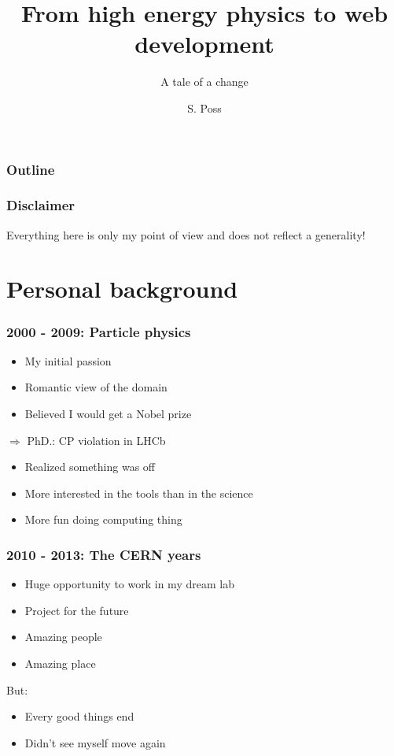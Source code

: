 \documentclass[]{beamer}
\author{S. Poss}
\title{From high energy physics to web development}
\subtitle{A tale of a change}
\begin{document}
\begin{frame}
\titlepage
\end{frame}

\begin{frame}
\frametitle{Outline}
\tableofcontents
\end{frame}

\begin{frame}
\frametitle{Disclaimer}
\centering
Everything here is only my point of view and does not reflect a generality!
\end{frame}

\section{Personal background}
\begin{frame}
\frametitle{2000 - 2009: Particle physics}
\begin{itemize}
\item My initial passion
\item Romantic view of the domain
\item Believed I would get a Nobel prize
\end{itemize}
$\Rightarrow$ PhD.: CP violation in LHCb
\pause
\begin{itemize}
\item Realized something was off
\item More interested in the tools than in the science
\item More fun doing computing thing
\end{itemize}
\end{frame}

\begin{frame}
\frametitle{2010 - 2013: The CERN years}
\begin{itemize}
\item Huge opportunity to work in my dream lab
\item Project for the future
\item Amazing people
\item Amazing place
\end{itemize}
\pause
But:
\begin{itemize}
\item Every good things end
\item Didn't see myself move again
\end{itemize}
\end{frame}
\end{document}
